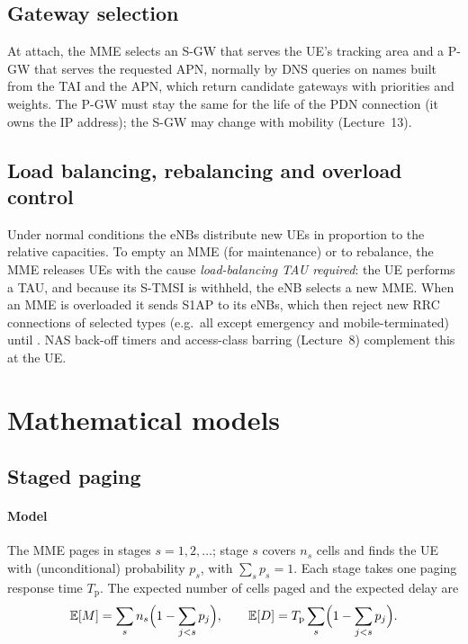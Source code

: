 \documentclass[11pt,a4paper]{article}
\begin{document}
\subsection{Gateway selection}
At attach, the MME selects an S-GW that serves the UE's tracking area and a P-GW that serves the
requested APN, normally by DNS queries on names built from the TAI and the APN, which return candidate
gateways with priorities and weights. The P-GW must stay the same for the life of the PDN connection
(it owns the IP address); the S-GW may change with mobility (Lecture~13).

\subsection{Load balancing, rebalancing and overload control}
Under normal conditions the eNBs distribute new UEs in proportion to the relative capacities. To empty an
MME (for maintenance) or to rebalance, the MME releases UEs with the cause \emph{load-balancing TAU
required}: the UE performs a TAU, and because its S-TMSI is withheld, the eNB selects a new MME.
When an MME is overloaded it sends S1AP  to its eNBs, which then reject new RRC
connections of selected types (e.g.\ all except emergency and mobile-terminated) until 
\cite{ts36413}. NAS back-off timers and access-class barring (Lecture~8) complement this at the UE.

\section{Mathematical models}

\subsection{Staged paging}\label{sec:paging}
\paragraph{Model} The MME pages in stages $s = 1,2,\dots$; stage $s$ covers $n_s$ cells and finds the UE
with (unconditional) probability $p_s$, with $\sum_s p_s = 1$. Each stage takes one paging response
time $T_\mathrm{p}$. The expected number of cells paged and the expected delay are
\begin{equation}\label{eq:paging}
  \mathbb{E}[M] = \sum_{s} n_s\Bigl(1-\sum_{j<s}p_j\Bigr), \qquad
  \mathbb{E}[D] = T_\mathrm{p}\sum_{s}\Bigl(1-\sum_{j<s}p_j\Bigr).
\end{equation}
\end{document}
